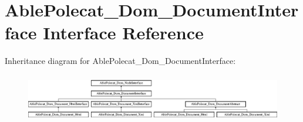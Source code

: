 \hypertarget{interface_able_polecat___dom___document_interface}{}\section{Able\+Polecat\+\_\+\+Dom\+\_\+\+Document\+Interface Interface Reference}
\label{interface_able_polecat___dom___document_interface}
Inheritance diagram for Able\+Polecat\+\_\+\+Dom\+\_\+\+Document\+Interface\+:\begin{figure}[H]
\begin{center}
\leavevmode
\includegraphics[height=2.121212cm]{interface_able_polecat___dom___document_interface}
\end{center}
\end{figure}
